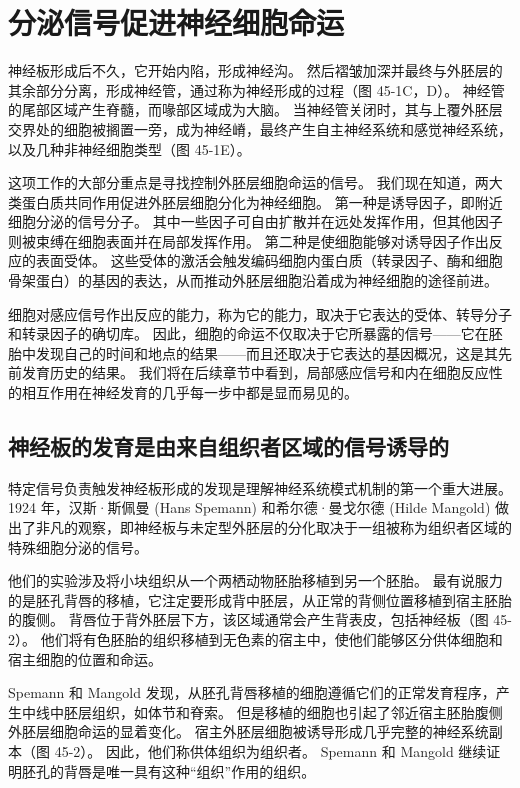 \section{分泌信号促进神经细胞命运}
神经板形成后不久，它开始内陷，形成神经沟。 然后褶皱加深并最终与外胚层的其余部分分离，形成神经管，通过称为神经形成的过程（图 45-1C，D）。 神经管的尾部区域产生脊髓，而喙部区域成为大脑。 当神经管关闭时，其与上覆外胚层交界处的细胞被搁置一旁，成为神经嵴，最终产生自主神经系统和感觉神经系统，以及几种非神经细胞类型（图 45-1E）。

这项工作的大部分重点是寻找控制外胚层细胞命运的信号。 我们现在知道，两大类蛋白质共同作用促进外胚层细胞分化为神经细胞。 第一种是诱导因子，即附近细胞分泌的信号分子。 其中一些因子可自由扩散并在远处发挥作用，但其他因子则被束缚在细胞表面并在局部发挥作用。 第二种是使细胞能够对诱导因子作出反应的表面受体。 这些受体的激活会触发编码细胞内蛋白质（转录因子、酶和细胞骨架蛋白）的基因的表达，从而推动外胚层细胞沿着成为神经细胞的途径前进。

细胞对感应信号作出反应的能力，称为它的能力，取决于它表达的受体、转导分子和转录因子的确切库。 因此，细胞的命运不仅取决于它所暴露的信号——它在胚胎中发现自己的时间和地点的结果——而且还取决于它表达的基因概况，这是其先前发育历史的结果。 我们将在后续章节中看到，局部感应信号和内在细胞反应性的相互作用在神经发育的几乎每一步中都是显而易见的。

\subsection{神经板的发育是由来自组织者区域的信号诱导的}
特定信号负责触发神经板形成的发现是理解神经系统模式机制的第一个重大进展。 1924 年，汉斯·斯佩曼 (Hans Spemann) 和希尔德·曼戈尔德 (Hilde Mangold) 做出了非凡的观察，即神经板与未定型外胚层的分化取决于一组被称为组织者区域的特殊细胞分泌的信号。


他们的实验涉及将小块组织从一个两栖动物胚胎移植到另一个胚胎。 最有说服力的是胚孔背唇的移植，它注定要形成背中胚层，从正常的背侧位置移植到宿主胚胎的腹侧。 背唇位于背外胚层下方，该区域通常会产生背表皮，包括神经板（图 45-2）。 他们将有色胚胎的组织移植到无色素的宿主中，使他们能够区分供体细胞和宿主细胞的位置和命运。

Spemann 和 Mangold 发现，从胚孔背唇移植的细胞遵循它们的正常发育程序，产生中线中胚层组织，如体节和脊索。 但是移植的细胞也引起了邻近宿主胚胎腹侧外胚层细胞命运的显着变化。 宿主外胚层细胞被诱导形成几乎完整的神经系统副本（图 45-2）。 因此，他们称供体组织为组织者。 Spemann 和 Mangold 继续证明胚孔的背唇是唯一具有这种“组织”作用的组织。

